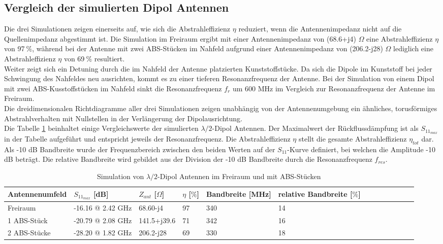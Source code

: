 \subsection{Vergleich der simulierten Dipol Antennen}\label{sec:VerglecihSimDipol}
Die drei Simulationen zeigen einerseits auf, wie sich die Abstrahleffizienz $\eta$ reduziert, wenn die Antennenimpedanz nicht auf die Quellenimpedanz abgestimmt ist. Die Simulation im Freiraum ergibt mit einer Antennenimpedanz von (68.6+j4) $\Omega$ eine Abstrahleffizienz $\eta$ von 97$\ \%$, während bei der Antenne mit zwei ABS-Stücken im Nahfeld aufgrund einer Antennenimpedanz von (206.2-j28) $\Omega$ lediglich eine Abstrahleffizienz $\eta$ von 69$\ \%$ resultiert. \\
Weiter zeigt sich ein Detuning durch die im Nahfeld der Antenne platzierten Kunststoffstücke. Da sich die Dipole im Kunststoff bei jeder Schwingung des Nahfeldes neu ausrichten, kommt es zu einer tieferen Resonanzfrequenz der Antenne. Bei der Simulation von einem Dipol mit zwei ABS-Kusstoffstücken im Nahfeld sinkt die Resonanzfrequenz $f_{r}$ um 600 MHz im Vergleich zur Resonanzfrequenz der Antenne im Freiraum.\\ 
Die dreidimensionalen Richtdiagramme aller drei Simulationen zeigen unabhängig von der Antennenumgebung ein ähnliches, torusförmiges Abstrahlverhalten mit Nullstellen in der Verlängerung der Dipolausrichtung.\\
Die Tabelle \ref{tab:Evaluation_Vergeich_Dipol Antennen} beinhaltet einige Vergleichswerte der simulierten $\lambda/2$-Dipol Antennen. Der Maximalwert der Rückflussdämpfung ist als $S_{11_{max}}$ in der Tabelle aufgeführt und entspricht jeweils der Resonanzfrequenz. Die Abstrahleffizienz $\eta$ stellt die gesamte Abstrahleffizienz $\eta_{tot}$ dar. Als -10 dB Bandbreite wurde der Frequenzbereich zwischen den beiden Werten auf der $S_{11}$-Kurve definiert, bei welchen die Amplitude -10 dB beträgt. Die relative Bandbreite wird gebildet aus der Division der -10 dB Bandbreite durch die Resonanzfrequenz $f_{res}$.
\begin{table}[!h]
 \centering
 \begin{tabular}{p{3cm} p{4cm} p{2cm} p{1.5cm} p{2cm} p{2.5cm} l c c c c p r} 
 \toprule 
 Antennenumfeld & $S_{11_{max}}$ [dB]		& $Z_{ant}$ [$\Omega$] 	& $\eta$ [$\%$] & Bandbreite [MHz] & relative Bandbreite [$\%$]\\ 
 \midrule
 Freiraum 			&	-16.16 @ 2.42 GHz		& 	68.60-j4			& 	97	&	340 & 14\\ 		
1 ABS-Stück 	& -20.79 @ 2.08 GHz 		&	141.5+j39.6		&	71	&	342	 & 16 \\
2 ABS-Stücke 	& -28.20 @ 1.82 GHz 	&	206.2-j28		&	69	&	330	 & 18 \\
 \bottomrule
 \end{tabular}
 \caption{Simulation von $\lambda/2$-Dipol Antennen im Freiraum und mit ABS-Stücken}
 \label{tab:Evaluation_Vergeich_Dipol Antennen}
\end{table}

